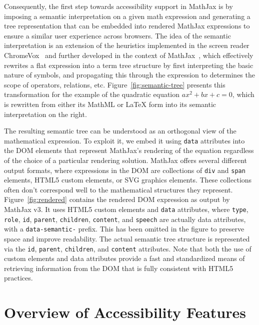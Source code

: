 \documentclass{sig-alternate}
\begin{document}
Consequently, the first step towards accessibility support in MathJax is by
imposing a semantic interpretation on a given math expression and generating a
tree representation that can be embedded into rendered MathJax expressions to
ensure a similar user experience across browsers. The idea of the semantic
interpretation is an extension of the heuristics implemented in the screen
reader ChromeVox~\cite{Sorge14} and further developed in the context of
MathJax~\cite{cervone2016towards}, which effectively rewrites a flat expression
into a term tree structure by first interpreting the basic nature of symbols, and
propagating this through the expression to determines the scope of operators,
relations, etc. Figure~\ref{fig:semantic-tree} presents this transformation for
the example of the quadratic equation $ax^2 + bx + c = 0$, which is rewritten
from either its MathML or {\LaTeX} form into its semantic interpretation on the
right.

The resulting semantic tree can be understood as an orthogonal view of the
mathematical expression. To exploit it, we embed it using \texttt{data} attributes
into the DOM elements that represent MathJax's rendering of the equation
regardless of the choice of a particular rendering solution. MathJax offers
several different output formats, where
expressions in the DOM are collections of \texttt{div} and \texttt{span}
elements, HTML5 custom elements, or SVG graphics elements. These collections
often don't correspond well to the mathematical structures they represent.
Figure~\ref{fig:rendered} contains the rendered DOM expression as output by
MathJax v3. It uses HTML5 custom elements and \texttt{data} attributes, where
\texttt{type}, \texttt{role}, \texttt{id}, \texttt{parent}, \texttt{children}, \texttt{content}, and \texttt{speech} are
actually data attributes, with a \texttt{data-semantic-} prefix. This has been
omitted in the figure to preserve space and improve readability. The actual
semantic tree structure is represented via the \texttt{id}, \texttt{parent}, \texttt{children},
and \texttt{content} attributes. Note that both the use of custom elements and data
attributes provide a fast and standardized means of retrieving information from
the DOM that is fully consistent with HTML5 practices.


\section{Overview of Accessibility Features}
\label{sec:at-solution}
\end{document}

